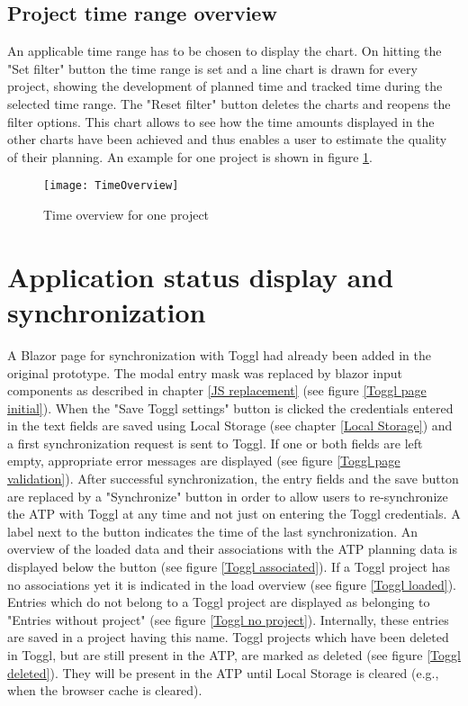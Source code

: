 \subsection{Project time range overview}
An applicable time range has to be chosen to display the chart. On hitting the "Set filter" button the time range is set and a line chart is drawn for every project, showing the development of planned time and tracked time during the selected time range. The "Reset filter" button deletes the charts and reopens the filter options. This chart allows to see how the time amounts displayed in the other charts have been achieved and thus enables a user to estimate the quality of their planning. An example for one project is shown in figure \ref{timeOverview}.
\begin{figure}[H]
	\centering
	\texttt{[image: TimeOverview]}
	\caption{Time overview for one project}
	\label{timeOverview}
\end{figure}

\section{Application status display and synchronization} \label{Status display}
A Blazor page for synchronization with Toggl had already been added in the original prototype. The modal entry mask was replaced by blazor input components as described in chapter \ref{JS replacement} (see figure \ref{Toggl page initial}). When the "Save Toggl settings" button is clicked the credentials entered in the text fields are saved using Local Storage (see chapter \ref{Local Storage}) and a first synchronization request is sent to Toggl. If one or both fields are left empty, appropriate error messages are displayed (see figure \ref{Toggl page validation}). After successful synchronization, the entry fields and the save button are replaced by a "Synchronize" button in order to allow users to re-synchronize the ATP with Toggl at any time and not just on entering the Toggl credentials. A label next to the button indicates the time of the last synchronization. An overview of the loaded data and their associations with the ATP planning data is displayed below the button (see figure \ref{Toggl associated}). If a Toggl project has no associations yet it is indicated in the load overview (see figure \ref{Toggl loaded}). Entries which do not belong to a Toggl project are displayed as belonging to "Entries without project" (see figure \ref{Toggl no project}). Internally, these entries are saved in a project having this name. Toggl projects which have been deleted in Toggl, but are still present in the ATP, are marked as deleted (see figure \ref{Toggl deleted}). They will be present in the ATP until Local Storage is cleared (e.g., when the browser cache is cleared).

